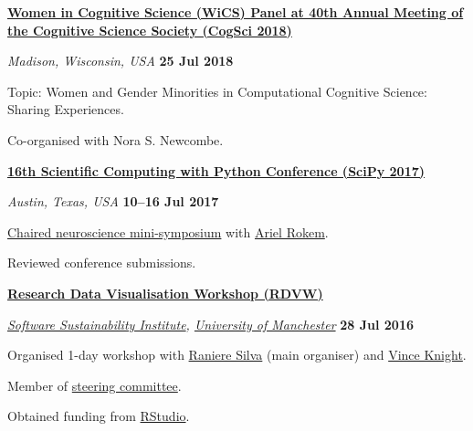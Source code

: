 \documentclass[10pt]{article}
\newenvironment{outerlist}[1][\enskip\textbullet]%
        {\begin{itemize}[#1]}{\end{itemize}%
         \vspace{-.6\baselineskip}}
\newenvironment{innerlist}[1][\enskip\textbullet]%
        {\begin{compactitem}[#1]}{\end{compactitem}}
\begin{document}
\textbf{\href{http://womenincogsci.org/announcement/wics-workshop-cognitive-science-society-meeting-madison-wisconsin}{Women in Cognitive Science (WiCS) Panel at 40th Annual Meeting of the Cognitive Science Society (CogSci 2018)}}
\begin{outerlist}
  \item[] \textit{Madison, Wisconsin, USA} \hfill \textbf{25 Jul 2018}
  \begin{innerlist}
    \item Topic: Women and Gender Minorities in Computational Cognitive Science: Sharing Experiences.
    \item Co-organised with Nora S. Newcombe.
  \end{innerlist}
\end{outerlist}
\vspace{8pt}
\begin{samepage}

\textbf{\href{https://scipy2017.scipy.org}{16th Scientific Computing with Python Conference (SciPy 2017)}}
\begin{outerlist}
  \item[] \textit{Austin, Texas, USA} \hfill \textbf{10--16 Jul 2017}
  \begin{innerlist}
    \item \href{https://scipy2017.scipy.org/ehome/220975/493433/}{Chaired neuroscience mini-symposium} with \href{http://arokem.org/}{Ariel Rokem}.
    \item Reviewed conference submissions.
  \end{innerlist}
\end{outerlist}
\vspace{8pt}\end{samepage}

\begin{samepage}

\textbf{\href{http://www.software.ac.uk/rdvw/}{Research Data Visualisation Workshop (RDVW)}}
\begin{outerlist}
  \item[] \textit{\href{http://software.ac.uk/}{Software Sustainability Institute}, \href{http://www.manchester.ac.uk/}{University of Manchester}} \hfill \textbf{28 Jul 2016}
  \begin{innerlist}
    \item Organised 1-day workshop with \href{http://www.software.ac.uk/about/people/raniere-silva}{Raniere Silva} (main organiser) and \href{http://www.cardiff.ac.uk/people/view/98654-knight-vincent}{Vince Knight}.
    \item Member of \href{http://www.software.ac.uk/rdvw/committees}{steering committee}.
    \item Obtained funding from \href{https://www.rstudio.com/}{RStudio}.
  \end{innerlist}
\end{outerlist}
\vspace{8pt}
\end{samepage}
\end{document}
